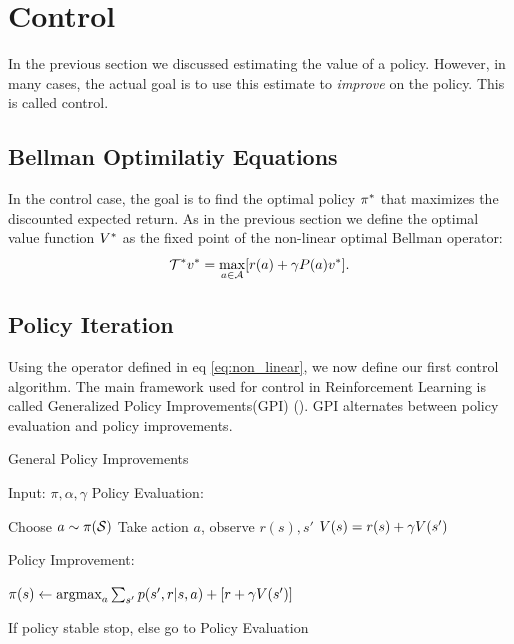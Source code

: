 \section{Control}
In the previous section we discussed estimating the value of a policy. However, in many cases, the actual goal is to use this estimate to \emph{improve} on the policy. This is called control.
\subsection{Bellman Optimilatiy Equations}
In the control case, the goal is to find the optimal policy $\pi^*$ that maximizes the discounted expected return. As in the previous section we define the optimal value function $V^*$ as the fixed point of the non-linear optimal Bellman operator:
\begin{equation}
\label{eq:non_linear}
    \mathcal{T}^* v^* = \max_{a \in \mathcal{A}} [r(a) + \gamma P(a)v^*].
\end{equation}

\subsection{Policy Iteration}
Using the operator defined in eq \ref{eq:non_linear}, we now define our first control algorithm. The main framework used for control in Reinforcement Learning is called Generalized Policy Improvements(GPI) (\citep{sutton1998reinforcement}). GPI alternates between policy evaluation and policy improvements.\\

\begin{algorithm}[H]
\caption{General Policy Improvements}
\begin{algorithmic}[1]
    \STATE Input: $\pi,\alpha,\gamma$
    \STATE Policy Evaluation:
    \begin{ALC@g}
            \STATE Choose $a \sim \pi(\mathcal{S})$
            \STATE Take action $a$, observe $r(s),s'$
            \STATE $V(s) =  r(s) + \gamma V(s') $
        \ENDFOR
    \end{ALC@g}
    \STATE Policy Improvement:
    \begin{ALC@g}
            \STATE $\pi(s) \leftarrow \text{argmax}_a \sum_{s'} p(s',r|s,a) + [r+\gamma V(s')]$
        \ENDFOR
    \end{ALC@g}
    \STATE If policy stable stop, else go to Policy Evaluation
\end{algorithmic}
\label{alg:GPI}
\end{algorithm}

